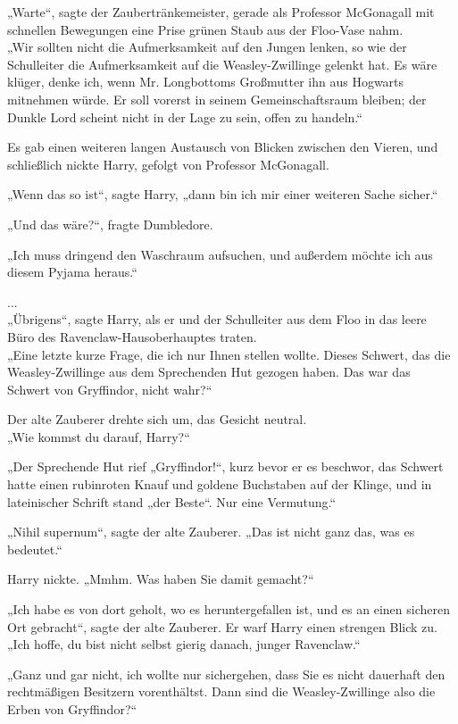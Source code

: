 {„Warte“, sagte der Zaubertränkemeister, gerade als Professor McGonagall mit schnellen Bewegungen eine Prise grünen Staub aus der Floo-Vase nahm.\\ „Wir sollten nicht die Aufmerksamkeit auf den Jungen lenken, so wie der Schulleiter die Aufmerksamkeit auf die Weasley-Zwillinge gelenkt hat. Es wäre klüger, denke ich, wenn Mr. Longbottoms Großmutter ihn aus Hogwarts mitnehmen würde. Er soll vorerst in seinem Gemeinschaftsraum bleiben; der Dunkle Lord scheint nicht in der Lage zu sein, offen zu handeln.“

Es gab einen weiteren langen Austausch von Blicken zwischen den Vieren, und schließlich nickte Harry, gefolgt von Professor McGonagall.

„Wenn das so ist“, sagte Harry, „dann bin ich mir einer weiteren Sache sicher.“

„Und das wäre?“, fragte Dumbledore.

„Ich muss dringend den Waschraum aufsuchen, und außerdem möchte ich aus diesem Pyjama heraus.“

...\\ „Übrigens“, sagte Harry, als er und der Schulleiter aus dem Floo in das leere Büro des Ravenclaw-Hausoberhauptes traten.\\ „Eine letzte kurze Frage, die ich nur Ihnen stellen wollte. Dieses Schwert, das die Weasley-Zwillinge aus dem Sprechenden Hut gezogen haben. Das war das Schwert von Gryffindor, nicht wahr?“

Der alte Zauberer drehte sich um, das Gesicht neutral.\\ „Wie kommst du darauf, Harry?“

„Der Sprechende Hut rief „Gryffindor!“, kurz bevor er es beschwor, das Schwert hatte einen rubinroten Knauf und goldene Buchstaben auf der Klinge, und in lateinischer Schrift stand „der Beste“. Nur eine Vermutung.“

„Nihil supernum“, sagte der alte Zauberer. „Das ist nicht ganz das, was es bedeutet.“

Harry nickte. „Mmhm. Was haben Sie damit gemacht?“

„Ich habe es von dort geholt, wo es heruntergefallen ist, und es an einen sicheren Ort gebracht“, sagte der alte Zauberer. Er warf Harry einen strengen Blick zu. „Ich hoffe, du bist nicht selbst gierig danach, junger Ravenclaw.“

„Ganz und gar nicht, ich wollte nur sichergehen, dass Sie es nicht dauerhaft den rechtmäßigen Besitzern vorenthältst. Dann sind die Weasley-Zwillinge also die Erben von Gryffindor?“

}
